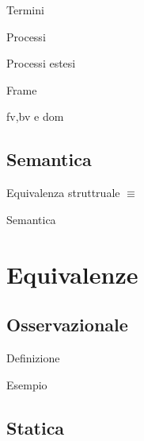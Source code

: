 \documentclass{beamer}
\theoremstyle{plain}
\theoremstyle{definition}
\theoremstyle{remark}
\begin{document}
\begin{frame}{Termini}
  
\end{frame}

\begin{frame}{Processi}
  
\end{frame}

\begin{frame}{Processi estesi}
  
\end{frame}

\begin{frame}{Frame}
  
\end{frame}

\begin{frame}{fv,bv e dom}
  
\end{frame}

\subsection{Semantica}

\begin{frame}{Equivalenza struttruale}
  $\equiv$
\end{frame}

\begin{frame}{Semantica}
  
\end{frame}


\section{Equivalenze}

\subsection{Osservazionale}

\begin{frame}{Definizione}
  
\end{frame}

\begin{frame}{Esempio}
  
\end{frame}

\subsection{Statica}
\end{document}
